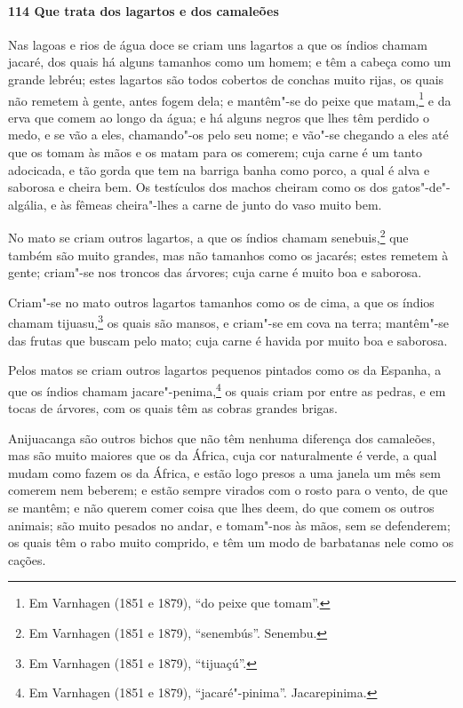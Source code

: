 \paragraph{114 Que trata dos lagartos e dos camaleões}

Nas lagoas e rios de água doce se criam uns lagartos a que os índios chamam jacaré, dos
quais há alguns tamanhos como um homem; e têm a cabeça como um grande lebréu; estes
lagartos são todos cobertos de conchas muito rijas, os quais não remetem à gente, antes
fogem dela; e mantêm"-se do peixe que matam,\footnote{ Em Varnhagen (1851 e 1879), ``do
peixe que tomam''.} e da erva que comem ao longo da água; e há alguns negros que lhes têm
perdido o medo, e se vão a eles, chamando"-os pelo seu nome; e vão"-se chegando a eles até
que os tomam às mãos e os matam para os comerem; cuja carne é um tanto adocicada, e tão
gorda que tem na barriga banha como porco, a qual é alva e saborosa e cheira bem. Os
testículos dos machos cheiram como os dos gatos"-de"-algália, e às fêmeas cheira"-lhes a
carne de junto do vaso muito bem.

No mato se criam outros lagartos, a que os índios chamam senebuis,\footnote{ Em Varnhagen
(1851 e 1879), ``senembús''. Senembu.} que também são muito grandes, mas não tamanhos
como os jacarés; estes remetem à gente; criam"-se nos troncos das árvores; cuja carne é
muito boa e saborosa.

Criam"-se no mato outros lagartos tamanhos como os de cima, a que os índios chamam
tijuasu,\footnote{ Em Varnhagen (1851 e 1879), ``tijuaçú''.} os quais são mansos, e
criam"-se em cova na terra; mantêm"-se das frutas que buscam pelo mato; cuja carne é havida
por muito boa e saborosa.

Pelos matos se criam outros lagartos pequenos pintados como os da Espanha, a que os índios
chamam jacare"-penima,\footnote{ Em Varnhagen (1851 e 1879), ``jacaré"-pinima''.
Jacarepinima.} os quais criam por entre as pedras, e em tocas de árvores, com os quais
têm as cobras grandes brigas.

Anijuacanga são outros bichos que não têm nenhuma diferença dos camaleões, mas são muito
maiores que os da África, cuja cor naturalmente é verde, a qual mudam como fazem os da
África, e estão logo presos a uma janela um mês sem comerem nem beberem; e estão sempre
virados com o rosto para o vento, de que se mantêm; e não querem comer coisa que lhes
deem, do que comem os outros animais; são muito pesados no andar, e tomam"-nos às mãos, sem
se defenderem; os quais têm o rabo muito comprido, e têm um modo de barbatanas nele como
os cações.

